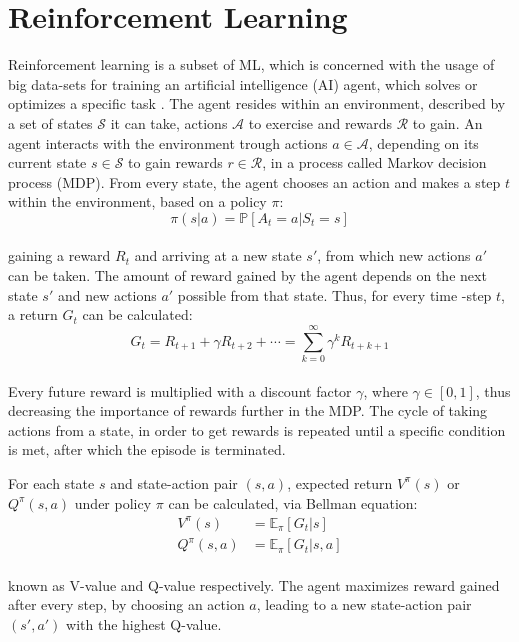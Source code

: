 \documentclass{article}
\begin{document}
\section{Reinforcement Learning}
Reinforcement learning is a subset of ML, which is concerned with the usage of big data-sets for training an artificial intelligence (AI) agent, which solves or optimizes a specific task \cite{lapan2018deep}. The agent resides within an environment, described by a set of states $\mathcal{S}$ it can take, actions $\mathcal{A}$ to exercise and rewards $\mathcal{R}$ to gain. An agent interacts with the environment trough actions $a\in\mathcal{A}$, depending on its current state $s\in\mathcal{S}$ to gain rewards $r\in\mathcal{R}$, in a process called Markov decision process (MDP). From every state, the agent chooses an action and makes a step $t$ within the environment, based on a policy $\pi$:
\begin{equation}
    \label{eqn:policy}
    \pi(s|a)=\mathbb{P}[A_t=a|S_t=s]
\end{equation}
\\
gaining a reward $R_t$ and arriving at a new state $s'$, from which new actions $a'$ can be taken. The amount of reward gained by the agent depends on the next state $s'$ and new actions $a'$ possible from that state. Thus, for every time -step $t$, a return $G_t$ can be calculated:
\begin{equation}
    G_t = R_{t+1}+\gamma R_{t+2}+\cdots = \sum_{k=0}^{\infty}\gamma^{k}R_{t+k+1}
\end{equation}
\\
Every future reward is multiplied with a discount factor $\gamma$, where $\gamma\in[0,1]$, thus decreasing the importance of rewards further in the MDP. The cycle of taking actions from a state, in order to get rewards is repeated until a specific condition is met, after which the episode is terminated.

For each state $s$ and state-action pair $(s,a)$, expected return $V^{\pi}(s)$ or $Q^{\pi}(s,a)$ under policy $\pi$ can be calculated, via Bellman equation:
\begin{align}
    \label{eq:bellman}
    V^\pi (s) &= \mathbb{E}_\pi[G_t|s] \\
    Q^\pi (s,a) &= \mathbb{E}_\pi[G_t|s,a]
\end{align}
\\
known as V-value and Q-value respectively. The agent maximizes reward gained after every step, by choosing an action $a$, leading to a new state-action pair $(s',a')$ with the highest Q-value.
\end{document}
